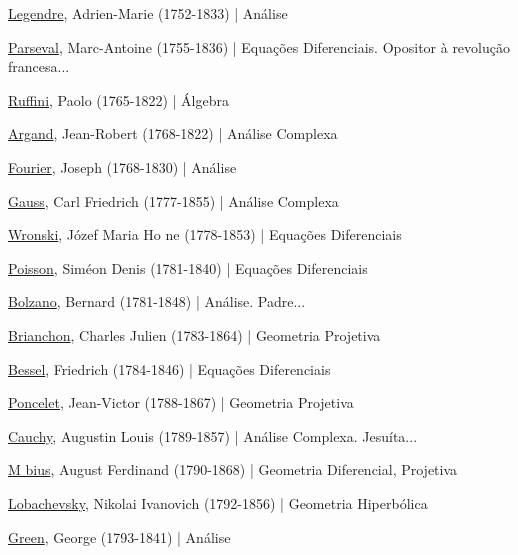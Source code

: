 \documentclass[12pt,a4paper]{article}
\begin{document}
			\href{http://pt.wikipedia.org/wiki/Adrien-Marie_Legendre}{Legendre}, Adrien-Marie (1752-1833) | An\'alise

			\href{http://pt.wikipedia.org/wiki/Marc-Antoine_Parseval}{Parseval}, Marc-Antoine (1755-1836) | Equa\c{c}\~oes Diferenciais. Opositor \`a revolu\c{c}\~ao francesa...

			\href{http://en.wikipedia.org/wiki/Paolo_Ruffini}{Ruffini}, Paolo (1765-1822) | \'Algebra

			\href{http://en.wikipedia.org/wiki/Jean-Robert_Argand}{Argand}, Jean-Robert (1768-1822) | An\'alise Complexa

			\href{http://pt.wikipedia.org/wiki/Jean-Baptiste_Joseph_Fourier}{Fourier}, Joseph (1768-1830) | An\'alise

			\href{http://pt.wikipedia.org/wiki/Carl_Friedrich_Gauss}{Gauss}, Carl Friedrich (1777-1855) | An\'alise Complexa

			\href{http://en.wikipedia.org/wiki/J\%C3\%B3zef_Maria_Hoene-Wro\%C5\%84ski}{Wronski}, J\'ozef Maria Ho ne (1778-1853) | Equa\c{c}\~oes Diferenciais

			\href{http://en.wikipedia.org/wiki/Poisson}{Poisson}, Sim\'eon Denis (1781-1840) | Equa\c{c}\~oes Diferenciais

			\href{http://pt.wikipedia.org/wiki/Bernard_Bolzano}{Bolzano}, Bernard (1781-1848) | An\'alise. Padre...

			\href{http://en.wikipedia.org/wiki/Charles_Julien_Brianchon}{Brianchon}, Charles Julien (1783-1864) | Geometria Projetiva

			\href{http://pt.wikipedia.org/wiki/Friedrich_Wilhelm_Bessel}{Bessel}, Friedrich (1784-1846) | Equa\c{c}\~oes Diferenciais

			\href{http://en.wikipedia.org/wiki/Jean-Victor_Poncelet}{Poncelet}, Jean-Victor (1788-1867) | Geometria Projetiva

			\href{http://pt.wikipedia.org/wiki/Augustin_Louis_Cauchy}{Cauchy}, Augustin Louis (1789-1857) | An\'alise Complexa. Jesu\'ita...

			\href{http://pt.wikipedia.org/wiki/August_Ferdinand_M\%C3\%B6bius}{M bius}, August Ferdinand (1790-1868) | Geometria Diferencial, Projetiva

			\href{http://pt.wikipedia.org/wiki/Nikolai_Ivanovich_Lobachevsky}{Lobachevsky}, Nikolai Ivanovich (1792-1856) | Geometria Hiperb\'olica

			\href{http://pt.wikipedia.org/wiki/George_Green}{Green}, George (1793-1841) | An\'alise
\end{document}
